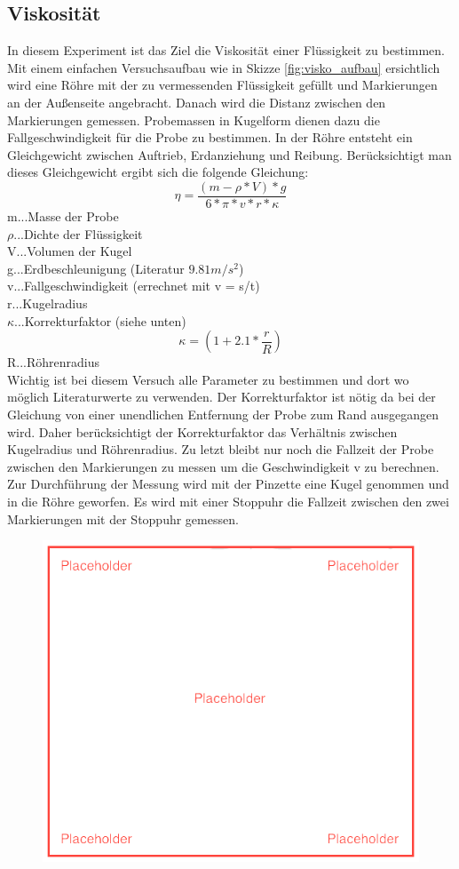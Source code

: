 \documentclass[12pt,a4paper]{article}
\begin{document}
\begin{multicols}{2}
\section{Viskosität}
In diesem Experiment ist das Ziel die Viskosität einer Flüssigkeit zu bestimmen. Mit einem einfachen Versuchsaufbau wie in Skizze \ref{fig:visko_aufbau} ersichtlich wird eine Röhre mit der zu vermessenden Flüssigkeit gefüllt und Markierungen an der Außenseite angebracht. Danach wird die Distanz zwischen den Markierungen gemessen. Probemassen in Kugelform dienen dazu die Fallgeschwindigkeit für die Probe zu bestimmen. In der Röhre entsteht ein Gleichgewicht zwischen Auftrieb, Erdanziehung und Reibung. Berücksichtigt man dieses Gleichgewicht ergibt sich die folgende Gleichung:
$$\eta = \frac{(m-\rho * V)*g}{6*\pi *v*r*\kappa}$$
m...Masse der Probe\\
$\rho$...Dichte der Flüssigkeit\\
V...Volumen der Kugel\\
g...Erdbeschleunigung (Literatur $9.81m/s^2$)\\
v...Fallgeschwindigkeit (errechnet mit v = s/t)\\
r...Kugelradius\\
$\kappa$...Korrekturfaktor (siehe unten)\\
$$\kappa =  (1+2.1 * \frac{r}{R})$$
R...Röhrenradius\\
Wichtig ist bei diesem Versuch alle Parameter zu bestimmen und dort wo möglich Literaturwerte zu verwenden. 
Der Korrekturfaktor ist nötig da bei der Gleichung von einer unendlichen Entfernung der Probe zum Rand ausgegangen wird. Daher berücksichtigt der Korrekturfaktor das Verhältnis zwischen Kugelradius und Röhrenradius. Zu letzt bleibt nur noch die Fallzeit der Probe zwischen den Markierungen zu messen um die Geschwindigkeit v zu berechnen.
Zur Durchführung der Messung wird mit der Pinzette eine Kugel genommen und in die Röhre geworfen. Es wird mit einer Stoppuhr die Fallzeit zwischen den zwei Markierungen mit der Stoppuhr gemessen.
\begin{figure}[H]
	\centering
	\includegraphics[scale=0.4]{./figure/placeholder.png}

\end{figure}
\end{multicols}
\end{document}

